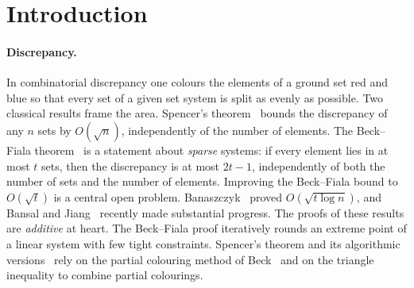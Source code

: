 \documentclass[11pt,letterpaper]{article}
\theoremstyle{definition}
\begin{document}
\begin{abstract}
For general $t$, if the bundle hypergraph is Berge-acyclic, the discrepancy is at most
$\mathcal{K}_t$, the worst-case discrepancy of $t$ arbitrary $1$-Lipschitz functions, and this is
tight; if every function meets at most $\Delta$ shared bundles, it is at most
$t\Delta\max(1,2^{\Delta-2})$. We also determine $\mathcal{K}_1,\dots,\mathcal{K}_6=1,2,2,3,3,4$ (the
upper bounds for $n\ge3$ are computer-assisted, in exact arithmetic), and show $\mathcal{K}_8\ge5$. The
same computer-assisted method, run at a threshold just below an integer, shows that every $2$-sparse
family of at most six functions has discrepancy at most $2$, and that eight functions give at most
$3$. The question remains open for $t=2$ on every pattern class of unbounded degeneracy, already for complete
graphs with single-item bundles. For $n$ functions, a weighted union bound gives
$\sqrt{2\ln(2t)\,n}$ for every $t$-sparse family, which is below $1.666\sqrt n$ for $t=2$ with arbitrary
bundle sizes, and a deterministic rounding gives $\sqrt{2n}+O(1)$ for single-item bundles. These
results, and exhaustive SAT computations, support the conjecture that every $2$-sparse family has
discrepancy at most $2$.
\end{abstract}

\section{Introduction}\label{sec:intro}

\paragraph{Discrepancy.}
In combinatorial discrepancy one colours the elements of a ground set red and blue so that every
set of a given set system is split as evenly as possible. Two classical results frame the area.
Spencer's theorem~\cite{Spe85} bounds the discrepancy of any $n$ sets by $O(\sqrt n)$,
independently of the number of elements. The Beck--Fiala theorem~\cite{BF81} is a statement about
\emph{sparse} systems: if every element lies in at most $t$ sets, then the discrepancy is at most
$2t-1$, independently of both the number of sets and the number of elements. Improving the
Beck--Fiala bound to $O(\sqrt t)$ is a central open problem. Banaszczyk~\cite{Ban98} proved
$O(\sqrt{t\log n})$, and Bansal and Jiang~\cite{BJ25,BJ26} recently made substantial progress. The
proofs of these results are \emph{additive} at heart. The Beck--Fiala proof iteratively rounds an
extreme point of a linear system with few tight constraints. Spencer's theorem and its
algorithmic versions~\cite{Ban10,LM15} rely on the partial colouring method of Beck~\cite{Bec81}
and on the triangle inequality to combine partial colourings.
\end{document}
